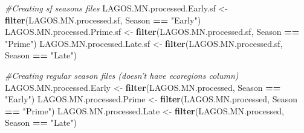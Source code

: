 \documentclass[12pt,]{article}
\newenvironment{Shaded}{\begin{snugshade}}{\end{snugshade}}
\newcommand{\CommentTok}[1]{\textcolor[rgb]{0.56,0.35,0.01}{\textit{#1}}}
\newcommand{\DataTypeTok}[1]{\textcolor[rgb]{0.13,0.29,0.53}{#1}}
\newcommand{\FloatTok}[1]{\textcolor[rgb]{0.00,0.00,0.81}{#1}}
\newcommand{\KeywordTok}[1]{\textcolor[rgb]{0.13,0.29,0.53}{\textbf{#1}}}
\newcommand{\NormalTok}[1]{#1}
\newcommand{\OperatorTok}[1]{\textcolor[rgb]{0.81,0.36,0.00}{\textbf{#1}}}
\newcommand{\StringTok}[1]{\textcolor[rgb]{0.31,0.60,0.02}{#1}}
\begin{document}
\begin{Shaded}
\begin{Highlighting}[]
\CommentTok{#Creating sf seasons files}
\NormalTok{LAGOS.MN.processed.Early.sf <-}\StringTok{ }\KeywordTok{filter}\NormalTok{(LAGOS.MN.processed.sf, Season }\OperatorTok{==}\StringTok{ "Early"}\NormalTok{)}
\NormalTok{LAGOS.MN.processed.Prime.sf <-}\StringTok{ }\KeywordTok{filter}\NormalTok{(LAGOS.MN.processed.sf, Season }\OperatorTok{==}\StringTok{ "Prime"}\NormalTok{)}
\NormalTok{LAGOS.MN.processed.Late.sf <-}\StringTok{ }\KeywordTok{filter}\NormalTok{(LAGOS.MN.processed.sf, Season }\OperatorTok{==}\StringTok{ "Late"}\NormalTok{)}

\CommentTok{#Creating regular season files (doesn't have ecoregions column)}
\NormalTok{LAGOS.MN.processed.Early <-}\StringTok{ }\KeywordTok{filter}\NormalTok{(LAGOS.MN.processed, Season }\OperatorTok{==}\StringTok{ "Early"}\NormalTok{)}
\NormalTok{LAGOS.MN.processed.Prime <-}\StringTok{ }\KeywordTok{filter}\NormalTok{(LAGOS.MN.processed, Season }\OperatorTok{==}\StringTok{ "Prime"}\NormalTok{)}
\NormalTok{LAGOS.MN.processed.Late <-}\StringTok{ }\KeywordTok{filter}\NormalTok{(LAGOS.MN.processed, Season }\OperatorTok{==}\StringTok{ "Late"}\NormalTok{)}
\end{Highlighting}
\end{Shaded}

\begin{Shaded}
\end{Shaded}
\end{document}
